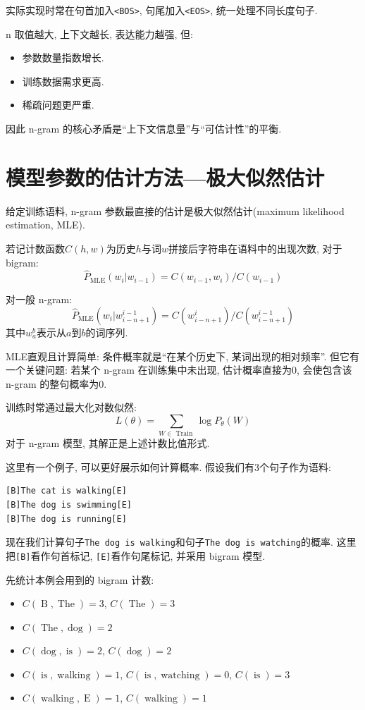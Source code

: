 实际实现时常在句首加入\texttt{\textless{}BOS\textgreater{}}, 句尾加入\texttt{\textless{}EOS\textgreater{}}, 统一处理不同长度句子.

n 取值越大, 上下文越长, 表达能力越强, 但:

\begin{itemize}
\item 参数数量指数增长.
\item 训练数据需求更高.
\item 稀疏问题更严重.
\end{itemize}

因此 n-gram 的核心矛盾是“上下文信息量”与“可估计性”的平衡.

\section{模型参数的估计方法---极大似然估计}


给定训练语料, n-gram 参数最直接的估计是极大似然估计(maximum likelihood estimation, MLE).

若记计数函数$C(h,w)$为历史$h$与词$w$拼接后字符串在语料中的出现次数,
对于 bigram:
\[
\hat{P}_{\operatorname{MLE}}(w_i | w_{i-1})
  = C(w_{i-1}, w_i) / C(w_{i-1})
\]

对一般 n-gram:
\[
\hat{P}_{\operatorname{MLE}}(w_i | w_{i-n+1}^{i-1})
  = C(w_{i-n+1}^i) / C(w_{i-n+1}^{i-1})
\]
其中$w_a^b$表示从$a$到$b$的词序列.

MLE直观且计算简单: 条件概率就是“在某个历史下, 某词出现的相对频率”.
但它有一个关键问题: 若某个 n-gram 在训练集中未出现, 估计概率直接为$0$,
会使包含该 n-gram 的整句概率为$0$.

训练时常通过最大化对数似然:
\[
L(\theta) = \sum_{W \in \operatorname{Train}} \log P_{\theta}(W)
\]
对于 n-gram 模型, 其解正是上述计数比值形式.

这里有一个例子, 可以更好展示如何计算概率.
假设我们有3个句子作为语料:
\begin{Verbatim}[breaklines=true,breakanywhere=true,fontsize=\small]
[B]The cat is walking[E]
[B]The dog is swimming[E]
[B]The dog is running[E]
\end{Verbatim}
现在我们计算句子\texttt{The dog is walking}和句子\texttt{The dog is watching}的概率.
这里把\texttt{[B]}看作句首标记, \texttt{[E]}看作句尾标记, 并采用 bigram 模型.

先统计本例会用到的 bigram 计数:

\begin{itemize}
\item $C(\operatorname{B}, \operatorname{The}) = 3$, $C(\operatorname{The}) = 3$
\item $C(\operatorname{The}, \operatorname{dog}) = 2$
\item $C(\operatorname{dog}, \operatorname{is}) = 2$, $C(\operatorname{dog}) = 2$
\item $C(\operatorname{is}, \operatorname{walking}) = 1$, $C(\operatorname{is}, \operatorname{watching}) = 0$, $C(\operatorname{is}) = 3$
\item $C(\operatorname{walking}, \operatorname{E}) = 1$, $C(\operatorname{walking}) = 1$
\end{itemize}


